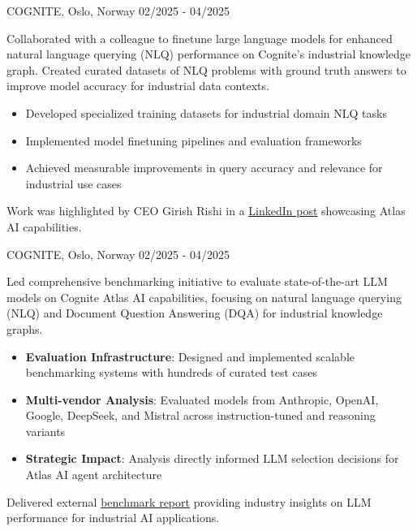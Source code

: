 \documentclass[singlesided,
               paper=a4,
               fontsize=10pt
              ]{my-resume}
\begin{document}
%
	{COGNITE, Oslo, Norway}
	{02/2025 - 04/2025}
    {
        Collaborated with a colleague to finetune large language models for enhanced natural language querying (NLQ) performance on Cognite's industrial knowledge graph. Created curated datasets of NLQ problems with ground truth answers to improve model accuracy for industrial data contexts.

        \begin{itemize}[leftmargin=2em]
            \item Developed specialized training datasets for industrial domain NLQ tasks
            \item Implemented model finetuning pipelines and evaluation frameworks
            \item Achieved measurable improvements in query accuracy and relevance for industrial use cases
        \end{itemize}

        Work was highlighted by CEO Girish Rishi in a \href{https://www.linkedin.com/posts/girish-rishi-4392587_atlas-ai-is-all-about-enabling-our-customers-activity-7336752688279207936-f58Y?utm_source=share&utm_medium=member_desktop&rcm=ACoAADAmkPABVhPkjuk0vvCtiRSid_p7fC4zU_o}{LinkedIn post} showcasing Atlas AI capabilities.
    }
%
	{COGNITE, Oslo, Norway}
	{02/2025 - 04/2025}
    {
        Led comprehensive benchmarking initiative to evaluate state-of-the-art LLM models on Cognite Atlas AI capabilities, focusing on natural language querying (NLQ) and Document Question Answering (DQA) for industrial knowledge graphs.

        \begin{itemize}[leftmargin=2em]
            \item \textbf{Evaluation Infrastructure}: Designed and implemented scalable benchmarking systems with hundreds of curated test cases
            \item \textbf{Multi-vendor Analysis}: Evaluated models from Anthropic, OpenAI, Google, DeepSeek, and Mistral across instruction-tuned and reasoning variants
            \item \textbf{Strategic Impact}: Analysis directly informed LLM selection decisions for Atlas AI agent architecture
        \end{itemize}

        Delivered external \href{https://www.cognite.com/en/resources/white-papers/atlas-ai-slm-llm-benchmark-report}{benchmark report} providing industry insights on LLM performance for industrial AI applications.
    }
\end{document}
